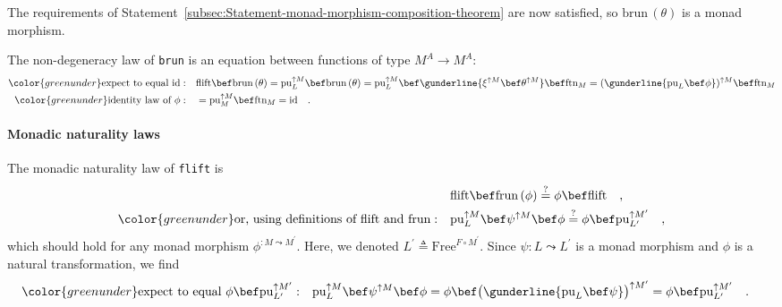 The requirements of Statement~\ref{subsec:Statement-monad-morphism-composition-theorem}
are now satisfied, so $\text{brun}\,(\theta)$ is a monad morphism.

The non-degeneracy law of \lstinline!brun! is an equation between
functions of type $M^{A}\rightarrow M^{A}$:
\begin{align*}
{\color{greenunder}\text{expect to equal }\text{id}:}\quad & \text{flift}\bef\text{brun}\,(\theta)=\text{pu}_{L}^{\uparrow M}\bef\text{brun}\,(\theta)=\text{pu}_{L}^{\uparrow M}\bef\gunderline{\xi^{\uparrow M}\bef\theta^{\uparrow M}}\bef\text{ftn}_{M}=(\gunderline{\text{pu}_{L}\bef\phi})^{\uparrow M}\bef\text{ftn}_{M}\\
{\color{greenunder}\text{identity law of }\phi:}\quad & =\text{pu}_{M}^{\uparrow M}\bef\text{ftn}_{M}=\text{id}\quad.
\end{align*}


\paragraph{Monadic naturality laws}

The monadic naturality law of \lstinline!flift! is 
\begin{align*}
 & \text{flift}\bef\text{frun}\,(\phi)\overset{?}{=}\phi\bef\text{flift}\quad,\\
{\color{greenunder}\text{or, using definitions of }\text{flift}\text{ and }\text{frun}:}\quad & \text{pu}_{L}^{\uparrow M}\bef\psi^{\uparrow M}\bef\phi\overset{?}{=}\phi\bef\text{pu}_{L^{\prime}}^{\uparrow M^{\prime}}\quad,
\end{align*}
which should hold for any monad morphism $\phi^{:M\leadsto M^{\prime}}$.
Here, we denoted $L^{\prime}\triangleq\text{Free}^{F\circ M^{\prime}}$.
Since $\psi:L\leadsto L^{\prime}$ is a monad morphism and $\phi$
is a natural transformation, we find
\begin{align*}
{\color{greenunder}\text{expect to equal }\phi\bef\text{pu}_{L^{\prime}}^{\uparrow M^{\prime}}:}\quad & \text{pu}_{L}^{\uparrow M}\bef\psi^{\uparrow M}\bef\phi=\phi\bef\big(\gunderline{\text{pu}_{L}\bef\psi}\big)^{\uparrow M^{\prime}}=\phi\bef\text{pu}_{L^{\prime}}^{\uparrow M^{\prime}}\quad.
\end{align*}

